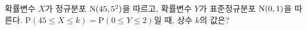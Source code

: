 확률변수 $X$가 정규분포 $\mathrm{N}(45{,}\mkern3mu\mathopen{}5^2)$을 따르고, 확률변수 $Y$가 표준정규분포 $\mathrm{N}(0{,}\mkern3mu\mathopen{}1)$을 따른다. $\mathrm{P}(45\le X\le k)=\mathrm{P}(0\le Y\le 2)$일 때, 상수 $k$의 값은?
